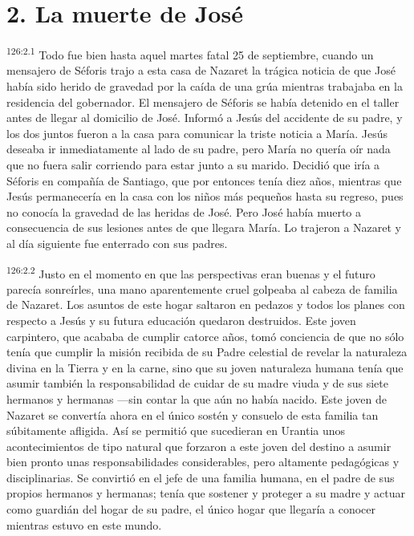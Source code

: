 \section*{2. La muerte de José}
\par
\textsuperscript{126:2.1} Todo fue bien hasta aquel martes fatal 25 de septiembre, cuando un mensajero de Séforis trajo a esta casa de Nazaret la trágica noticia de que José había sido herido de gravedad por la caída de una grúa mientras trabajaba en la residencia del gobernador. El mensajero de Séforis se había detenido en el taller antes de llegar al domicilio de José. Informó a Jesús del accidente de su padre, y los dos juntos fueron a la casa para comunicar la triste noticia a María. Jesús deseaba ir inmediatamente al lado de su padre, pero María no quería oír nada que no fuera salir corriendo para estar junto a su marido. Decidió que iría a Séforis en compañía de Santiago, que por entonces tenía diez años, mientras que Jesús permanecería en la casa con los niños más pequeños hasta su regreso, pues no conocía la gravedad de las heridas de José. Pero José había muerto a consecuencia de sus lesiones antes de que llegara María. Lo trajeron a Nazaret y al día siguiente fue enterrado con sus padres.

\par
\textsuperscript{126:2.2} Justo en el momento en que las perspectivas eran buenas y el futuro parecía sonreírles, una mano aparentemente cruel golpeaba al cabeza de familia de Nazaret. Los asuntos de este hogar saltaron en pedazos y todos los planes con respecto a Jesús y su futura educación quedaron destruidos. Este joven carpintero, que acababa de cumplir catorce años, tomó conciencia de que no sólo tenía que cumplir la misión recibida de su Padre celestial de revelar la naturaleza divina en la Tierra y en la carne, sino que su joven naturaleza humana tenía que asumir también la responsabilidad de cuidar de su madre viuda y de sus siete hermanos y hermanas ---sin contar la que aún no había nacido. Este joven de Nazaret se convertía ahora en el único sostén y consuelo de esta familia tan súbitamente afligida. Así se permitió que sucedieran en Urantia unos acontecimientos de tipo natural que forzaron a este joven del destino a asumir bien pronto unas responsabilidades considerables, pero altamente pedagógicas y disciplinarias. Se convirtió en el jefe de una familia humana, en el padre de sus propios hermanos y hermanas; tenía que sostener y proteger a su madre y actuar como guardián del hogar de su padre, el único hogar que llegaría a conocer mientras estuvo en este mundo.

